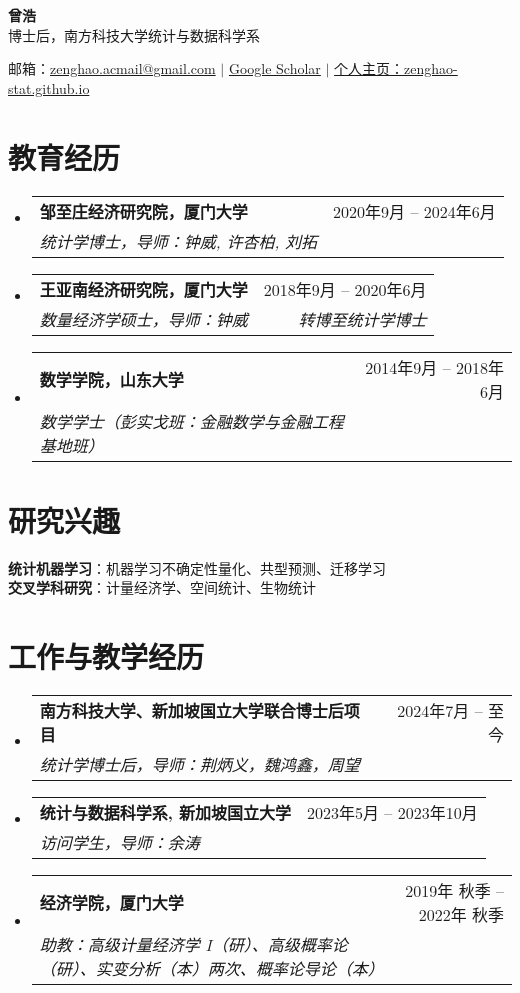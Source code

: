 \documentclass[letterpaper,10pt]{article}
\makeatletter
\newcommand{\resumeSubheading}[4]{
  \vspace{-2pt}\item
    \begin{tabular*}{0.97\textwidth}[t]{l@{\extracolsep{\fill}}r}
      \textbf{#1} & #2 \\
      \textit{\small#3} & \textit{\small #4} \\
    \end{tabular*}\vspace{-7pt}
}
\newcommand{\resumeSubHeadingListStart}{\begin{itemize}[leftmargin=0.15in, label={}]}
\newcommand{\resumeSubHeadingListEnd}{\end{itemize}}
\makeatother
\begin{document}
\begin{center}
    \textbf{\Huge \scshape 曾浩}
    \vspace{0.5em}\\
    {\small 博士后，南方科技大学统计与数据科学系}
\end{center}

\begin{center}
    \small 邮箱：\href{mailto:zenghao.acmail@gmail.com}{zenghao.acmail@gmail.com} $|$
    \href{https://scholar.google.com/citations?user=-EiBHeIAAAAJ&hl=en}{Google Scholar} $|$
    \href{https://zenghao-stat.github.io}{个人主页：zenghao-stat.github.io}
\end{center}

\section{教育经历}
  \resumeSubHeadingListStart
    \resumeSubheading
      {邹至庄经济研究院，厦门大学}{2020年9月 -- 2024年6月}
      {统计学博士，导师：钟威, 许杏柏, 刘拓}{}
    
    \resumeSubheading
      {王亚南经济研究院，厦门大学}{2018年9月 -- 2020年6月}
      {数量经济学硕士，导师：钟威}{转博至统计学博士}
    
    \resumeSubheading
      {数学学院，山东大学}{2014年9月 -- 2018年6月}
      {数学学士（彭实戈班：金融数学与金融工程基地班）}{}
  \resumeSubHeadingListEnd


\section{研究兴趣}
 \begin{itemize}[leftmargin=0.15in, label={}]
    \small{\item{
     \textbf{统计机器学习}{：机器学习不确定性量化、共型预测、迁移学习} \\
     \textbf{交叉学科研究}{：计量经济学、空间统计、生物统计}
    }}
 \end{itemize}

\section{工作与教学经历}
  \resumeSubHeadingListStart
    \resumeSubheading
      {南方科技大学、新加坡国立大学联合博士后项目}{2024年7月 -- 至今}
      {统计学博士后，导师：荆炳义，魏鸿鑫，周望}{}
    
    \resumeSubheading
      {统计与数据科学系, 新加坡国立大学}{2023年5月 -- 2023年10月}
      {访问学生，导师：余涛}{}
    \resumeSubheading
      {经济学院，厦门大学}{2019年 秋季 -- 2022年 秋季}
      {助教：高级计量经济学 I（研）、高级概率论（研）、实变分析（本）两次、概率论导论（本）}{}
  \resumeSubHeadingListEnd
\end{document}
